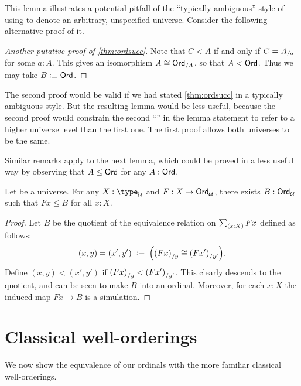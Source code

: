 This lemma illustrates a potential pitfall of the ``typically ambiguous'' style of using \UU to denote an arbitrary, unspecified universe.
Consider the following alternative proof of it.

\begin{proof}[Another putative proof of \autoref{thm:ordsucc}]
  Note that $C<A$ if and only if $C={A}_{/a}$ for some $a:A$.
  This gives an isomorphism $A \cong {\ensuremath{\mathsf{Ord}}}_{/A}$, so that $A<\mathsf{Ord}$.
  Thus we may take $B\vcentcolon\equiv\mathsf{Ord}$.
\end{proof}

The second proof would be valid if we had stated \autoref{thm:ordsucc} in a typically ambiguous style.
But the resulting lemma would be less useful, because the second proof would constrain the second ``\ord'' in the lemma statement to refer to a higher universe level than the first one.
The first proof allows both universes to be the same.

Similar remarks apply to the next lemma, which could be proved in a less useful way by observing that $A\le \mathsf{Ord}$ for any $A:\mathsf{Ord}$.

\begin{lem}\label{thm:ordunion}
  Let \bbU be a universe.
  For any $X:\type_\bbU$ and $F:X\to \mathsf{Ord}_\mathcal{U}$, there exists $B:\mathsf{Ord}_\mathcal{U}$ such that $Fx\le B$ for all $x:X$.
\end{lem}
\begin{proof}
  Let $B$ be the quotient of the equivalence relation on $\sm{x:X} Fx$ defined as follows:
  \[ (x,y)  = (x',y')
  \;\vcentcolon\equiv\;
  \Big({(Fx)}_{/y} \cong {(Fx')}_{/y'}\Big).
  \]
  Define $(x,y)<(x',y')$ if ${(Fx)}_{/y} < {(Fx')}_{/y'}$.
  This clearly descends to the quotient, and can be seen to make $B$ into an ordinal.
  Moreover, for each $x:X$ the induced map $Fx\to B$ is a simulation.
\end{proof}



\section{Classical well-orderings}
\label{sec:wellorderings}

We now show the equivalence of our ordinals with the more familiar classical well-orderings.

